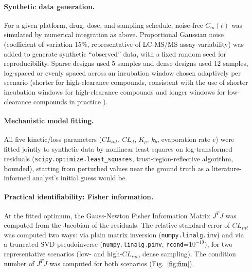 \paragraph{Synthetic data generation.} For a given platform, drug, dose, and sampling schedule, noise-free $C_m(t)$ was simulated by numerical integration as above. Proportional Gaussian noise (coefficient of variation 15\%, representative of LC-MS/MS assay variability) was added to generate synthetic ``observed'' data, with a fixed random seed for reproducibility. Sparse designs used 5 samples and dense designs used 12 samples, log-spaced or evenly spaced across an incubation window chosen adaptively per scenario (shorter for high-clearance compounds, consistent with the use of shorter incubation windows for high-clearance compounds and longer windows for low-clearance compounds in practice \citep{rajan2023}).

\paragraph{Mechanistic model fitting.} All five kinetic/loss parameters ($CL_{int}$, $CL_d$, $K_p$, $k_b$, evaporation rate $e$) were fitted jointly to synthetic data by nonlinear least squares on log-transformed residuals (\texttt{scipy.optimize.least\_squares}, trust-region-reflective algorithm, bounded), starting from perturbed values near the ground truth as a literature-informed analyst's initial guess would be.

\paragraph{Practical identifiability: Fisher information.} At the fitted optimum, the Gauss-Newton Fisher Information Matrix $J^TJ$ was computed from the Jacobian of the residuals. The relative standard error of $CL_{int}$ was computed two ways: via plain matrix inversion (\texttt{numpy.linalg.inv}) and via a truncated-SVD pseudoinverse (\texttt{numpy.linalg.pinv}, \texttt{rcond}=$10^{-10}$), for two representative scenarios (low- and high-$CL_{int}$, dense sampling). The condition number of $J^TJ$ was computed for both scenarios (Fig.~\ref{fig:fim}).

